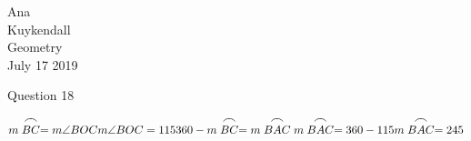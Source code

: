 \documentclass[12pt]{article}
\newcommand{\tarc}{\mbox{\large$\frown$}}
\newcommand{\arc}[1]{\stackrel{\tarc}{#1}}
\begin{document}
\begin{flushleft}

Ana\\
Kuykendall\\
Geometry\\
July 17 2019\\


\begin{center}
Question 18
\end{center}


\setlength{\parindent}{0.5in}
\setlength{\parindent}{0.5in}


\begin{equation}
  m \arc{BC} = m \angle{BOC} \\
  m \angle{BOC} = 115 \\
  360 - m \arc{BC} = m \arc{BAC} \\
  m \arc {BAC} = 360 - 115 \\
  m \arc{BAC} = 245 \\
\end{equation}




\end{flushleft}
\end{document}
